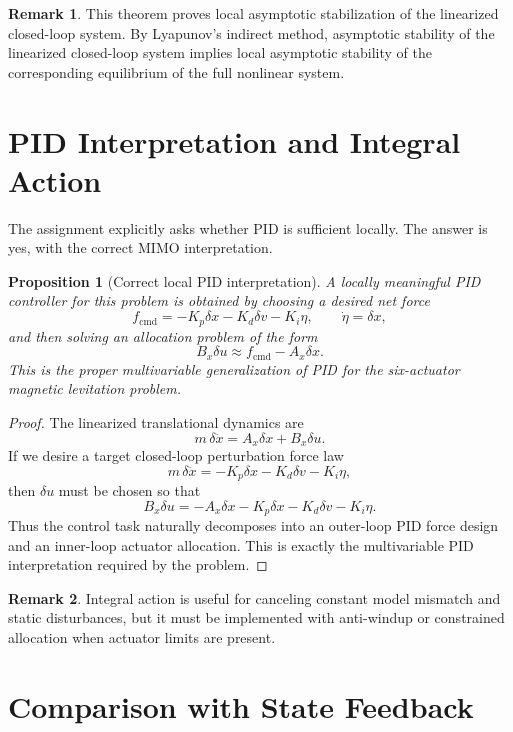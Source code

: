 \documentclass[11pt]{article}
\newtheorem{proposition}{Proposition}
\theoremstyle{definition}
\newtheorem{remark}{Remark}
\begin{document}
\begin{remark}
This theorem proves local asymptotic stabilization of the linearized closed-loop system. By Lyapunov's indirect method, asymptotic stability of the linearized closed-loop system implies local asymptotic stability of the corresponding equilibrium of the full nonlinear system.
\end{remark}

\section{PID Interpretation and Integral Action}

The assignment explicitly asks whether PID is sufficient locally. The answer is yes, with the correct MIMO interpretation.

\begin{proposition}[Correct local PID interpretation]
A locally meaningful PID controller for this problem is obtained by choosing a desired net force
\[
f_{\mathrm{cmd}} = -K_p\delta x - K_d\delta v - K_i\eta,
\qquad
\dot\eta=\delta x,
\]
and then solving an allocation problem of the form
\[
B_x\delta u \approx f_{\mathrm{cmd}} - A_x\delta x.
\]
This is the proper multivariable generalization of PID for the six-actuator magnetic levitation problem.
\end{proposition}

\begin{proof}
The linearized translational dynamics are
\[
m\,\delta \ddot x = A_x\delta x + B_x\delta u.
\]
If we desire a target closed-loop perturbation force law
\[
m\,\delta \ddot x = -K_p\delta x - K_d\delta v - K_i\eta,
\]
then $\delta u$ must be chosen so that
\[
B_x\delta u = -A_x\delta x - K_p\delta x - K_d\delta v - K_i\eta.
\]
Thus the control task naturally decomposes into an outer-loop PID force design and an inner-loop actuator allocation. This is exactly the multivariable PID interpretation required by the problem.
\end{proof}

\begin{remark}
Integral action is useful for canceling constant model mismatch and static disturbances, but it must be implemented with anti-windup or constrained allocation when actuator limits are present.
\end{remark}

\section{Comparison with State Feedback}
\end{document}
